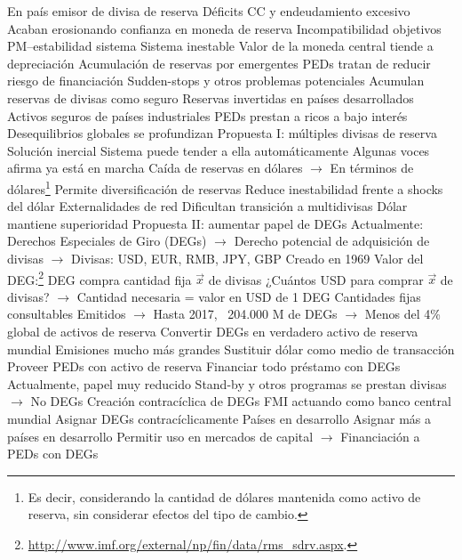 \documentclass{nuevotema}
\begin{document}
\begin{esquemal}
				\4[] En país emisor de divisa de reserva
				\4 Déficits CC y endeudamiento excesivo
				\4[] Acaban erosionando confianza en moneda de reserva
				\4[$\then$] Incompatibilidad objetivos PM--estabilidad sistema
				\4[$\then$] Sistema inestable
				\4[] Valor de la moneda central tiende a depreciación
			\3 Acumulación de reservas por emergentes
				\4 PEDs tratan de reducir riesgo de financiación
				\4[] Sudden-stops y otros problemas potenciales
				\4 Acumulan reservas de divisas como seguro
				\4 Reservas invertidas en países desarrollados
				\4[] Activos seguros de países industriales
				\4[$\then$] PEDs prestan a ricos a bajo interés
				\4[$\then$] Desequilibrios globales se profundizan
			\3 Propuesta I: múltiples divisas de reserva
				\4 Solución inercial
				\4[] Sistema puede tender a ella automáticamente
				\4 Algunas voces afirma ya está en marcha
				\4[] Caída de reservas en dólares
				\4[] $\to$ En términos de dólares\footnote{Es decir, considerando la cantidad de dólares mantenida como activo de reserva, sin considerar efectos del tipo de cambio.}
				\4 Permite diversificación de reservas
				\4[] Reduce inestabilidad frente a shocks del dólar
				\4 Externalidades de red
				\4[] Dificultan transición a multidivisas
				\4[] Dólar mantiene superioridad
			\3 Propuesta II: aumentar papel de DEGs
				\4 Actualmente:
				\4[] Derechos Especiales de Giro (DEGs)
				\4[] $\to$ Derecho potencial de adquisición de divisas
				\4[] $\to$ Divisas: USD, EUR, RMB, JPY, GBP
				\4[] Creado en 1969
				\4[] Valor del DEG:\footnote{\url{http://www.imf.org/external/np/fin/data/rms\_sdrv.aspx}.}
				\4[] DEG compra cantidad fija $\vec{x}$ de divisas
				\4[] ¿Cuántos USD para comprar $\vec{x}$ de divisas?
				\4[] $\to$ Cantidad necesaria = valor en USD de 1 DEG
				\4[] Cantidades fijas consultables
				\4[] Emitidos
				\4[] $\to$ Hasta 2017, ~204.000 M de DEGs
				\4[] $\to$ Menos del 4\% global de activos de reserva
				\4 Convertir DEGs en verdadero activo de reserva mundial
				\4[] Emisiones mucho más grandes
				\4[] Sustituir dólar como medio de transacción
				\4[] Proveer PEDs con activo de reserva
				\4 Financiar todo préstamo con DEGs
				\4[] Actualmente, papel muy reducido
				\4[] Stand-by y otros programas se prestan divisas
				\4[] $\to$ No DEGs
				\4 Creación contracíclica de DEGs
				\4[] FMI actuando como banco central mundial
				\4[] Asignar DEGs contracíclicamente
				\4 Países en desarrollo
				\4[] Asignar más a países en desarrollo
				\4[] Permitir uso en mercados de capital
				\4[] $\to$ Financiación a PEDs con DEGs

\end{esquemal}
\end{document}
